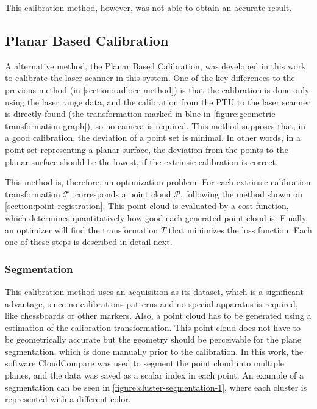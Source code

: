 This calibration method, however, was not able to obtain an accurate result.

\subsection{Planar Based Calibration}
\label{section:proposed-method}

A alternative method, the Planar Based Calibration, was developed in this work to calibrate the laser scanner in this system. One of the key differences to the previous method (in \cref{section:radlocc-method}) is that the calibration is done only using the laser range data, and the calibration from the PTU to the laser scanner is directly found (the transformation marked in blue in \cref{figure:geometric-transformation-graph}), so no camera is required. This method supposes that, in a good calibration, the deviation of a point set is minimal. In other words, in a point set representing a planar surface, the deviation from the points to the planar surface should be the lowest, if the extrinsic calibration is correct.

This method is, therefore, an optimization problem. For each extrinsic calibration transformation $\mathcal{T}$, corresponds a point cloud $\mathcal{P}$, following the method shown on \cref{section:point-registration}. This point cloud is evaluated by a cost function, which determines quantitatively how good each generated point cloud is. Finally, an optimizer will find the transformation $T$ that minimizes the loss function. Each one of these steps is described in detail next.

\subsubsection{Segmentation}

This calibration method uses an acquisition as its dataset, which is a significant advantage, since no calibrations patterns and no special apparatus is required, like chessboards or other markers. Also, a point cloud has to be generated using a estimation of the calibration transformation. This point cloud does not have to be geometrically accurate but the geometry should be perceivable for the plane segmentation, which is done manually prior to the calibration. In this work, the software CloudCompare was used to segment the point cloud into multiple planes, and the data was saved as a scalar index in each point. An example of a segmentation can be seen in \cref{figure:cluster-segmentation-1}, where each cluster is represented with a different color.

